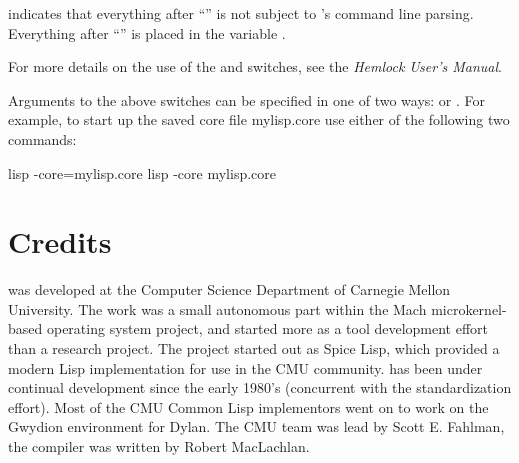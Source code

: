 \begin{Lentry}
\item[\code{--}] indicates that everything after ``\code{--}'' is not
  subject to \cmucl's command line parsing.  Everything after
  ``\code{--}'' is placed in the variable
  .
\end{Lentry}

For more details on the use of the  and 
switches, see the {\it Hemlock User's Manual}.

Arguments to the above switches can be specified in one of two ways:
 or
.  For example, to start up
the saved core file mylisp.core use either of the following two
commands:

\begin{example}
   lisp -core=mylisp.core
   lisp -core mylisp.core
\end{example}


\section{Credits}

\cmucl{} was developed at the Computer Science Department of Carnegie
Mellon University. The work was a small autonomous part within the
Mach microkernel-based operating system project, and started more as a
tool development effort than a research project. The project started
out as Spice Lisp, which provided a modern Lisp implementation for use
in the CMU community. \cmucl{} has been under continual development since
the early 1980's (concurrent with the \clisp{} standardization
effort). Most of the CMU Common Lisp implementors went on to work on
the Gwydion environment for Dylan. The CMU team was lead by Scott E.
Fahlman, the \python{} compiler was written by Robert MacLachlan.


